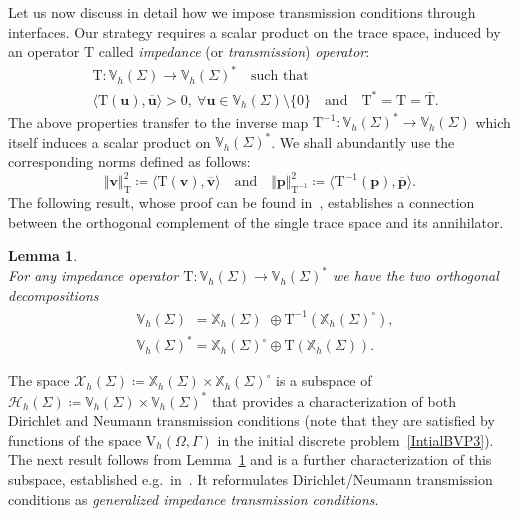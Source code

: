 \documentclass[a4paper,11pt]{article}
\newcommand{\mT}{\mathrm{T}}
\newcommand{\mbV}{\mathbb{V}}
\newcommand{\mbX}{\mathbb{X}}
\newcommand{\Vh}{\mathrm{V}_{h}}
\newcommand{\bp}{\boldsymbol{p}}
\newcommand{\bu}{\boldsymbol{u}}
\newcommand{\bv}{\boldsymbol{v}}
\newtheorem{lem}[defn]{Lemma}
\begin{document}
\medskip
Let us now discuss in detail how we impose transmission
conditions through interfaces. Our strategy requires a
scalar product on the trace space, induced by an operator $\mT$ called \emph{impedance} (or \emph{transmission}) \emph{operator}:
\begin{equation}\label{ChoiceImpedance}
  \begin{aligned}
    & \mT\colon\mbV_h(\Sigma)\to \mbV_h(\Sigma)^*\quad \text{such that}\\
    & \langle \mT(\bu),\overline{\bu}\rangle>0, \ \forall \bu\in \mbV_h(\Sigma)\setminus\{0\}
    \quad \text{and}\quad \mT^* = \mT = \overline{\mT}.
  \end{aligned}
\end{equation}
The above properties transfer to the inverse map
$\mT^{-1}\colon \mbV_h(\Sigma)^*\to \mbV_h(\Sigma)$ which itself induces a
scalar product on $\mbV_h(\Sigma)^*$. We shall abundantly use the
corresponding norms defined as follows:
\begin{equation*}
  \Vert \bv\Vert_{\mT}^{2}\coloneq \langle \mT(\bv),\overline{\bv}\rangle\quad \text{and}\quad
  \Vert \bp\Vert_{\mT^{-1}}^{2}\coloneq \langle \mT^{-1}(\bp),\overline{\bp}\rangle.
\end{equation*}
The following result, whose proof can be found in~\cite[Lemma 3.4]{MR4648528}, establishes a connection between the
orthogonal complement of the single trace space and its annihilator.
\begin{lem}\label{OrthogonalDecomposition}\quad\\
  For any impedance operator $\mT\colon \mbV_h(\Sigma)\to \mbV_h(\Sigma)^*$ we have
  the two orthogonal decompositions
  \begin{equation*}
    \begin{aligned}
     & \mbV_h(\Sigma)^{\phantom{*}} = \mbX_h(\Sigma)^{\phantom{\circ}}\oplus \mT^{-1}(\mbX_h(\Sigma)^{\circ}),\\
     & \mbV_h(\Sigma)^{*} = \mbX_h(\Sigma)^{\circ}\oplus \mT(\mbX_h(\Sigma)).
    \end{aligned}
  \end{equation*}
\end{lem} 
\noindent 
The space $\mathscr{X}_h(\Sigma) \coloneq \mbX_h(\Sigma)\times \mbX_h(\Sigma)^{\circ}$ is a subspace
of $\mathscr{H}_h(\Sigma) \coloneq \mbV_h(\Sigma)\times \mbV_h(\Sigma)^*$ that provides a
characterization of both Dirichlet and Neumann transmission conditions (note that they are satisfied by functions of the space $\Vh(\Omega,\Gamma)$ 
in the initial discrete problem~\eqref{IntialBVP3}). The next result follows from Lemma~\ref{OrthogonalDecomposition} and 
is a further characterization of this subspace, established e.g.~in~\cite[Lemma
3.5 and 3.7]{MR4648528}. It reformulates Dirichlet/Neumann transmission conditions as \emph{generalized impedance transmission conditions}.
\end{document}
